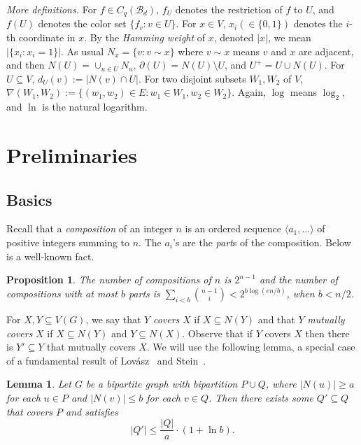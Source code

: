 \documentclass{amsart}
\newtheorem{prop}[thm]{Proposition}
\newtheorem{lem}[thm]{Lemma}
\theoremstyle{definition}
\newcommand{\cB}{\mathcal{B} }
\newcommand{\nin}[0]{\noindent}
\newcommand{\sub}[0]{\subseteq}
\newcommand{\0}[0]{\emptyset}
\begin{document}
\nin \textit{More definitions.} For $f \in C_q(\cB_d)$, $f_U$ denotes the restriction of $f$ to $U$, and $f(U)$ denotes the color set $\{f_v: v \in U\}$. For $x \in V$, $x_i (\in \{0,1\})$ denotes the $i$-th coordinate in $x$. By the \textit{Hamming weight} of $x$, denoted $|x|$, we mean $|\{x_i:x_i=1\}|$. As usual $N_x=\{v: v \sim x\}$ where $v \sim x$ means $v$ and $x$ are adjacent, and then $N(U)=\cup_{u \in U} N_u$, $\partial(U)=N(U) \setminus U$, and $U^+=U \cup N(U)$.  For $U \sub V$, $d_U(v):=|N(v) \cap U|$. For two disjoint subsets $W_1,W_2$ of $V$, $\nabla(W_1,W_2):=\{(w_1,w_2) \in E:w_1 \in W_1, w_2 \in W_2\}$. 
Again, $\log$ means $\log_2$, and $\ln$ is the natural logarithm.



\section{Preliminaries}\label{sec.prelim}



\subsection{Basics}

Recall that a \textit{composition} of an integer $n$ is an ordered sequence $\langle a_1,\ldots\rangle $ of positive integers summing to $n$. The $a_i$’s are the \textit{part}s of the composition. Below is a well-known fact.

\begin{prop}\label{prop:decom}
The  number  of  compositions  of $n$ is $2^{n-1}$ and  the  number of compositions with  at  most $b$ parts is $\sum_{i<b}\binom{n-1}{i}<2^{b\log(en/b)}$, when $b< n/2$.
\end{prop}




For $X,Y \sub V(G)$, we say that $Y$ \textit{covers} $X$ if $X \sub N(Y)$ and that $Y$ \textit{mutually covers} $X$ if $X \sub N(Y)$ and $Y \sub N(X)$. Observe that if $Y$ covers $X$ then there is $Y' \sub Y$ that mutually covers $X$.
We will use the following lemma, a special case of a fundamental result of Lov\'{a}sz~\cite{lovasz1975ratio} and Stein~\cite{stein1974two}. 

\begin{lem}\label{lem:cover}
Let $G$ be a bipartite graph with bipartition $P\cup Q$, where $|N(u)|\geq a$ for each $u \in P$ and $|N(v)|\leq b$ for each $v\in Q$. Then there exists some $Q'\subseteq Q$ that covers $P$ and satisfies
\[
|Q'|\leq \frac{|Q|}{a}\cdot (1 + \ln b).
\]
\end{lem}
\end{document}
